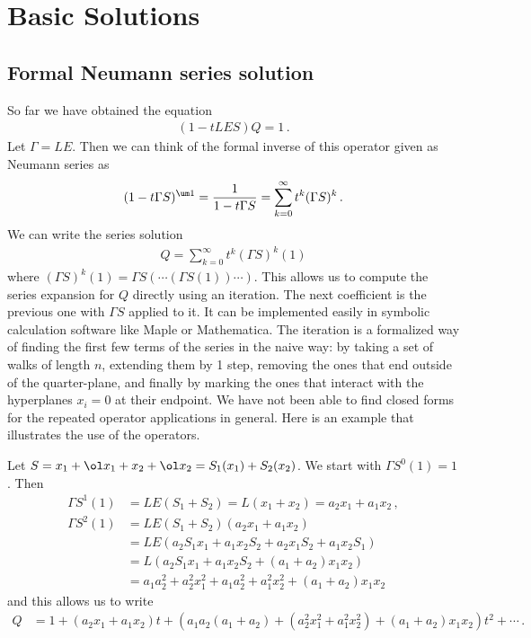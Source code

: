 \section{Basic Solutions}
\subsection{Formal Neumann series solution}
So far we have obtained the equation
\begin{align}
	(1-tLES)Q = 1\,.
\end{align}
Let $\Gamma = LE$. Then we can think of the formal inverse of this operator given as Neumann series as
\begin{align}
	(1-t\Gamma S)^{\um 1} = \frac{1}{1-t\Gamma S} = \sum_{k=0}^{\infty}t^k(\Gamma S)^k\,.
\end{align}
We can write the series solution
\begin{align}
Q = \sum_{k=0}^{\infty}t^k (\Gamma S)^k(1)
\end{align}
where $(\Gamma S)^k(1) = \Gamma S(\cdots (\Gamma S(1))\cdots)$. This allows us to compute the series expansion for $Q$ directly using an iteration. The next coefficient is the previous one with $\Gamma S$ applied to it. It can be implemented easily in symbolic calculation software like Maple or Mathematica. The iteration is a formalized way of finding the first few terms of the series in the naive way: by taking a set of walks of length $n$, extending them by 1 step, removing the ones that end outside of the quarter-plane, and finally by marking the ones that interact with the hyperplanes $x_i = 0$ at their endpoint. We have not been able to find closed forms for the repeated operator applications in general. Here is an example that illustrates the use of the operators.
\begin{example} Let $S = x_1+\ol x_1+x_2+\ol x_2 = S_1(x_1)+S_2(x_2)$. We start with $\Gamma S^0(1) = 1$. Then
\begin{align*}
	\Gamma S^1(1) &= LE(S_1+S_2) =L(x_1+x_2) = a_2x_1+a_1x_2\,,\\
	\Gamma  S^2(1) &= LE(S_1+S_2)(a_2x_1+a_1x_2) \\
	&= LE(a_2S_1x_1+a_1x_2S_2 + a_2x_1S_2+a_1x_2S_1)\\
	&= L(a_2S_1x_1+a_1x_2S_2+(a_1+a_2)x_1x_2)\\
	&=a_1a_2^2+a_2^2x_1^2+a_1a_2^2+a_1^2x_2^2+(a_1+a_2)x_1x_2
\end{align*}
and this allows us to write
\begin{align}
	Q & = 1 + (a_2x_1+a_1x_2)t + \left(a_1a_2(a_1+a_2)+(a_2^2x_1^2+a_1^2x_2^2)+(a_1+a_2)x_1x_2\right)t^2+\cdots\,.
\end{align}
\end{example}

